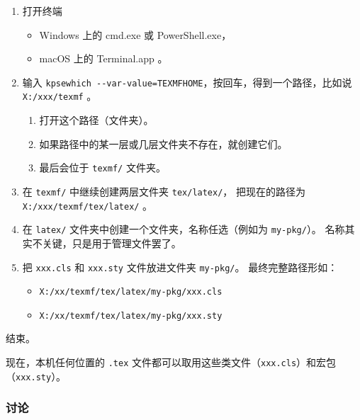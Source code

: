 \documentclass[../Main/thesis.tex]{subfiles}
\begin{document}
\begin{enumerate}
\def\labelenumi{\arabic{enumi}.}
\item
  打开终端

  \begin{itemize}
  \item
    Windows 上的 cmd.exe 或 PowerShell.exe，
  \item
    macOS 上的 Terminal.app 。
  \end{itemize}
\item
  输入
  \texttt{kpsewhich\ -\/-var-value=TEXMFHOME}，按回车，得到一个路径，比如说
  \texttt{X:/xxx/texmf} 。

  \begin{enumerate}
  \def\labelenumii{\arabic{enumii}.}
  \item
    打开这个路径（文件夹）。
  \item
    如果路径中的某一层或几层文件夹不存在，就创建它们。
  \item
    最后会位于 \texttt{texmf/} 文件夹。
  \end{enumerate}
\item
  在 \texttt{texmf/} 中继续创建两层文件夹 \texttt{tex/latex/}，
  把现在的路径为 \texttt{X:/xxx/texmf/tex/latex/} 。
\item
  在 \texttt{latex/} 文件夹中创建一个文件夹，名称任选（例如为
  \texttt{my-pkg/}）。 名称其实不关键，只是用于管理文件罢了。
\item
  把 \texttt{xxx.cls} 和 \texttt{xxx.sty} 文件放进文件夹
  \texttt{my-pkg/}。 最终完整路径形如：

  \begin{itemize}
  \item
    \texttt{X:/xx/texmf/tex/latex/my-pkg/xxx.cls}
  \item
    \texttt{X:/xx/texmf/tex/latex/my-pkg/xxx.sty}
  \end{itemize}
\end{enumerate}

结束。

现在，本机任何位置的 \texttt{.tex}
文件都可以取用这些类文件（\texttt{xxx.cls}）和宏包（\texttt{xxx.sty}）。

\subsubsection{讨论}
\end{document}

